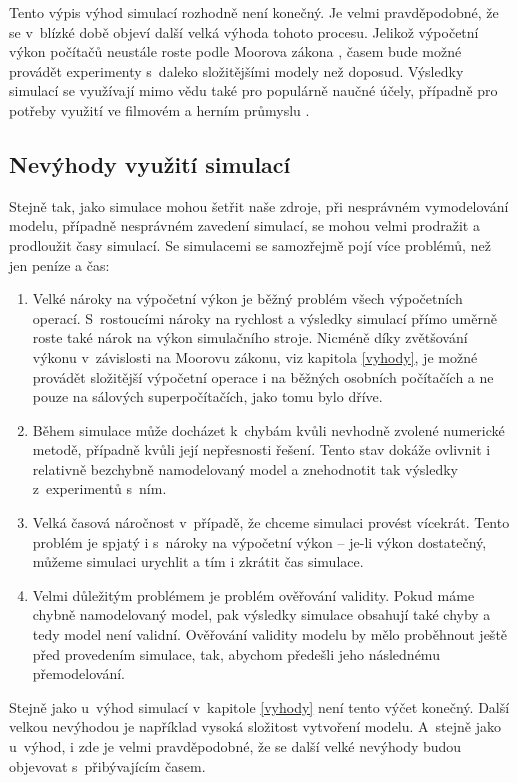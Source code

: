 Tento výpis výhod simulací rozhodně není konečný. Je velmi pravděpodobné, že se v~blízké době objeví další velká výhoda tohoto procesu. Jelikož výpočetní výkon počítačů neustále roste podle Moorova zákona \cite{Schaller1997}, časem bude možné provádět experimenty s~daleko složitějšími modely než doposud. Výsledky simulací se využívají mimo vědu také pro populárně naučné účely, případně pro potřeby využití ve filmovém a herním průmyslu \cite{James_2015}.

\subsection{Nevýhody využití simulací}

Stejně tak, jako simulace mohou šetřit naše zdroje, při nesprávném vymodelování modelu, případně nesprávném zavedení simulací, se mohou velmi prodražit a prodloužit časy simulací. Se simulacemi se samozřejmě pojí více problémů, než jen peníze a čas:

\begin{enumerate}
    \item Velké nároky na výpočetní výkon je běžný problém všech výpočetních operací. S~rostoucími nároky na rychlost a výsledky simulací přímo uměrně roste také nárok na výkon simulačního stroje. Nicméně díky zvětšování výkonu v~závislosti na Moorovu zákonu, viz kapitola \ref{vyhody}, je možné provádět složitější výpočetní operace i na běžných osobních počítačích a ne pouze na sálových superpočítačích, jako tomu bylo dříve.
    \item Během simulace může docházet k~chybám kvůli nevhodně zvolené numerické metodě, případně kvůli její nepřesnosti řešení. Tento stav dokáže ovlivnit i relativně bezchybně namodelovaný model a znehodnotit tak výsledky z~experimentů s~ním.
    \item Velká časová náročnost v~případě, že chceme simulaci provést vícekrát. Tento problém je spjatý i s~nároky na výpočetní výkon -- je-li výkon dostatečný, můžeme simulaci urychlit a tím i zkrátit čas simulace.
    \item Velmi důležitým problémem je problém ověřování validity. Pokud máme chybně namodelovaný model, pak výsledky simulace obsahují také chyby a tedy model není validní. Ověřování validity modelu by mělo proběhnout ještě před provedením simulace, tak, abychom předešli jeho následnému přemodelování.
\end{enumerate}

Stejně jako u~výhod simulací v~kapitole \ref{vyhody} není tento výčet konečný. Další velkou nevýhodou je například vysoká složitost vytvoření modelu. A~stejně jako u~výhod, i zde je velmi pravděpodobné, že se další velké nevýhody budou objevovat s~přibývajícím časem.

